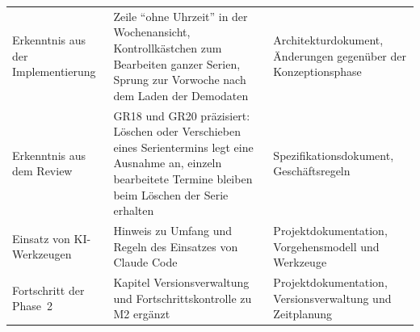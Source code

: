 \begin{longtable}{@{}L{4.0cm}L{7.4cm}L{4.6cm}@{}}
  Erkenntnis aus der Implementierung & Zeile \enquote{ohne Uhrzeit} in der Wochenansicht, Kontrollkästchen zum Bearbeiten ganzer Serien, Sprung zur Vorwoche nach dem Laden der Demodaten & Architekturdokument, Änderungen gegenüber der Konzeptionsphase \\
  Erkenntnis aus dem Review & GR18 und GR20 präzisiert: Löschen oder Verschieben eines Serientermins legt eine Ausnahme an, einzeln bearbeitete Termine bleiben beim Löschen der Serie erhalten & Spezifikationsdokument, Geschäftsregeln \\
  Einsatz von \ac{KI}-Werkzeugen & Hinweis zu Umfang und Regeln des Einsatzes von Claude Code & Projektdokumentation, Vorgehensmodell und Werkzeuge \\
  Fortschritt der Phase~2 & Kapitel Versionsverwaltung und Fortschrittskontrolle zu M2 ergänzt & Projektdokumentation, Versionsverwaltung und Zeitplanung \\
\end{longtable}
\endgroup
{}

